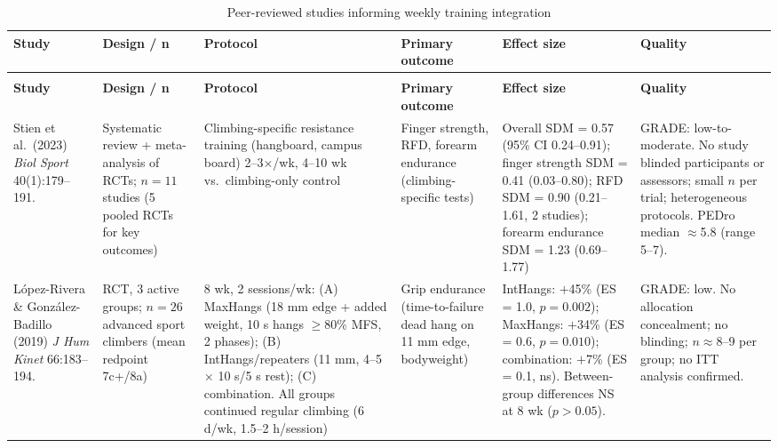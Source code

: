\renewcommand{\arraystretch}{1.3}
\begin{longtable}{>{\raggedright}p{3.4cm} >{\raggedright}p{2.6cm} >{\raggedright}p{3.8cm} >{\raggedright}p{3.1cm} >{\raggedright}p{3.0cm} >{\raggedright\arraybackslash}p{2.2cm}}
\caption{Peer-reviewed studies informing weekly training integration}
\label{tab:weekly_studies}\\
\toprule
\textbf{Study} & \textbf{Design / n} & \textbf{Protocol} & \textbf{Primary outcome} & \textbf{Effect size} & \textbf{Quality} \\
\midrule
\endfirsthead
\multicolumn{6}{l}{\small\itshape Table \ref{tab:weekly_studies} continued\ldots} \\
\toprule
\textbf{Study} & \textbf{Design / n} & \textbf{Protocol} & \textbf{Primary outcome} & \textbf{Effect size} & \textbf{Quality} \\
\midrule
\endhead
\bottomrule
\endlastfoot

Stien et al.\ (2023) \textit{Biol Sport} 40(1):179–191. \cite{SO23}
& Systematic review + meta-analysis of RCTs; $n = 11$ studies (5 pooled RCTs for key outcomes)
& Climbing-specific resistance training (hangboard, campus board) 2–3$\times$/wk, 4–10 wk vs.\ climbing-only control
& Finger strength, RFD, forearm endurance (climbing-specific tests)
& Overall SDM = 0.57 (95\% CI 0.24–0.91); finger strength SDM = 0.41 (0.03–0.80); RFD SDM = 0.90 (0.21–1.61, 2 studies); forearm endurance SDM = 1.23 (0.69–1.77)
& GRADE: low-to-moderate. No study blinded participants or assessors; small $n$ per trial; heterogeneous protocols. PEDro median $\approx$5.8 (range 5–7). \\

López-Rivera \& González-Badillo (2019) \textit{J Hum Kinet} 66:183–194. \cite{O19}
& RCT, 3 active groups; $n = 26$ advanced sport climbers (mean redpoint 7c+/8a)
& 8 wk, 2 sessions/wk: (A) MaxHangs (18 mm edge + added weight, 10 s hangs $\geq$80\% MFS, 2 phases); (B) IntHangs/repeaters (11 mm, 4–5 $\times$ 10 s/5 s rest); (C) combination. All groups continued regular climbing (6 d/wk, 1.5–2 h/session)
& Grip endurance (time-to-failure dead hang on 11 mm edge, bodyweight)
& IntHangs: $+$45\% (ES = 1.0, $p = 0.002$); MaxHangs: $+$34\% (ES = 0.6, $p = 0.010$); combination: $+$7\% (ES = 0.1, ns). Between-group differences NS at 8 wk ($p > 0.05$).
& GRADE: low. No allocation concealment; no blinding; $n \approx 8$--9 per group; no ITT analysis confirmed. \\


\end{longtable}
